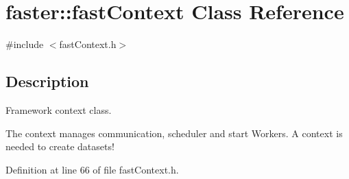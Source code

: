 \hypertarget{classfaster_1_1fastContext}{}\section{faster\+:\+:fast\+Context Class Reference}
\label{classfaster_1_1fastContext}


{\ttfamily \#include $<$fast\+Context.\+h$>$}



\subsection{Description}
Framework context class. 

The context manages communication, scheduler and start Workers. A context is needed to create datasets! 

Definition at line 66 of file fast\+Context.\+h.

